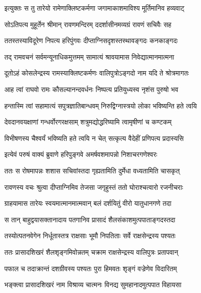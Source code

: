 \twolineshloka
{इत्युक्तः स तु तारेयो रामेणाक्लिष्टकर्मणा}
{जगामाकाशमाविश्य मूर्तिमानिव हव्यवाट्} %

\twolineshloka
{सोऽतिपत्य मुहूर्तेन श्रीमान् रावणमन्दिरम्}
{ददर्शासीनमव्यग्रं रावणं सचिवैः सह} %

\twolineshloka
{ततस्तस्याविदूरेण निपत्य हरिपुंगवः}
{दीप्ताग्निसदृशस्तस्थावङ्गदः कनकाङ्गदः} %

\twolineshloka
{तद् रामवचनं सर्वमन्यूनाधिकमुत्तमम्}
{सामात्यं श्रावयामास निवेद्यात्मानमात्मना} %

\twolineshloka
{दूतोऽहं कोसलेन्द्रस्य रामस्याक्लिष्टकर्मणः}
{वालिपुत्रोऽङ्गदो नाम यदि ते श्रोत्रमागतः} %

\twolineshloka
{आह त्वां राघवो रामः कौसल्यानन्दवर्धनः}
{निष्पत्य प्रतियुध्यस्व नृशंस पुरुषो भव} %

\twolineshloka
{हन्तास्मि त्वां सहामात्यं सपुत्रज्ञातिबान्धवम्}
{निरुद्विग्नास्त्रयो लोका भविष्यन्ति हते त्वयि} %

\twolineshloka
{देवदानवयक्षाणां गन्धर्वोरगरक्षसाम्}
{शत्रुमद्योद्धरिष्यामि त्वामृषीणां च कण्टकम्} %

\twolineshloka
{विभीषणस्य चैश्वर्यं भविष्यति हते त्वयि}
{न चेत् सत्कृत्य वैदेहीं प्रणिपत्य प्रदास्यसि} %

\twolineshloka
{इत्येवं परुषं वाक्यं ब्रुवाणे हरिपुङ्गवे}
{अमर्षवशमापन्नो निशाचरगणेश्वरः} %

\twolineshloka
{ततः स रोषमापन्नः शशास सचिवांस्तदा}
{गृह्यतामिति दुर्मेधा वध्यतामिति चासकृत्} %

\twolineshloka
{रावणस्य वचः श्रुत्वा दीप्ताग्निमिव तेजसा}
{जगृहुस्तं ततो घोराश्चत्वारो रजनीचराः} %

\twolineshloka
{ग्राहयामास तारेयः स्वयमात्मानमात्मवान्}
{बलं दर्शयितुं वीरो यातुधानगणे तदा} %

\twolineshloka
{स तान् बाहुद्वयासक्तानादाय पतगानिव}
{प्रासादं शैलसंकाशमुत्पपाताङ्गदस्तदा} %

\twolineshloka
{तस्योत्पतनवेगेन निर्धूतास्तत्र राक्षसाः}
{भूमौ निपतिताः सर्वे राक्षसेन्द्रस्य पश्यतः} %

\twolineshloka
{ततः प्रासादशिखरं शैलशृङ्गमिवोन्नतम्}
{चक्राम राक्षसेन्द्रस्य वालिपुत्रः प्रतापवान्} %

\twolineshloka
{पफाल च तदाक्रान्तं दशग्रीवस्य पश्यतः}
{पुरा हिमवतः शृङ्गं वज्रेणेव विदारितम्} %

\twolineshloka
{भङ्क्त्वा प्रासादशिखरं नाम विश्राव्य चात्मनः}
{विनद्य सुमहानादमुत्पपात विहायसा} %

